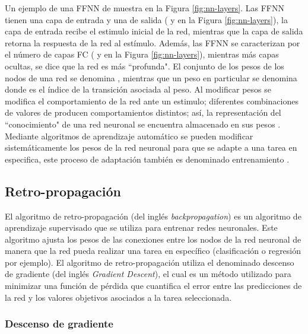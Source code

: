 Un ejemplo de una FFNN de muestra en la Figura \ref{fig:nn-layers}. Las FFNN tienen una capa de entrada y una de salida ( y  en la Figura \ref{fig:nn-layers}), la capa de entrada recibe el estimulo inicial de la red, mientras que la capa de salida retorna la respuesta de la red al estímulo. Además, las FFNN se caracterizan por el número de capas FC ( y  en la Figura \ref{fig:nn-layers}), mientras más capas ocultas, se dice que la red es más ``profunda". El conjunto de los pesos de los nodos de una red se denomina \jim{\theta}, mientras que un peso en particular se denomina  donde  es el índice de la transición asociada al peso. Al modificar pesos \jim{\theta} se modifica el comportamiento de la red ante un estimulo; diferentes combinaciones de valores de \jim{\theta} producen comportamientos distintos; así, la representación del ``conocimiento" de una red neuronal se encuentra almacenado en sus pesos \jim{\theta}. Mediante algoritmos de aprendizaje automático se pueden modificar sistemáticamente los pesos de la red neuronal para que se adapte a una tarea en especifica, este proceso de adaptación también es denominado entrenamiento \cite{Gurney1997}.

\subsection{Retro-propagación}

El algoritmo de retro-propagación (del inglés \textit{backpropagation}) es un algoritmo de aprendizaje supervisado que se utiliza para entrenar redes neuronales. Este algoritmo ajusta los pesos de las conexiones entre los nodos de la red neuronal de manera que la red pueda realizar una tarea en específico (clasificación o regresión por ejemplo). El algoritmo de retro-propagación utiliza el denominado descenso de gradiente (del inglés \textit{Gradient Descent}), el cual es un método utilizado para minimizar una función de pérdida que cuantifica el error entre las predicciones de la red y los valores objetivos asociados a la tarea seleccionada.

\subsubsection{Descenso de gradiente}

